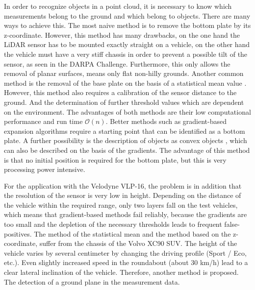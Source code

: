 \documentclass[11pt,oneside,openright]{mpreport}
\begin{document}
In order to recognize objects in a point cloud, it is necessary to know which measurements belong to the ground and which belong to objects.
There are many ways to achieve this. The most naive method is to remove the bottom plate by its z-coordinate.
However, this method has many drawbacks, on the one hand the LiDAR sensor has to be mounted exactly straight on a vehicle, 
on the other hand the vehicle must have a very stiff chassis in order to prevent a possible tilt of the sensor, as seen in the \ac{DARPA} Challenge.
Furthermore, this only allows the removal of planar surfaces, means only flat non-hilly grounds. 
Another common method is the removal of the base plate on the basis of a statistical mean value \cite{Zhang}.
However, this method also requires a calibration of the sensor distance to the ground. 
And the determination of further threshold values which are dependent on the environment.
The advantages of both methods are their low computational performance and run time $\mathcal{O}(n)$.
Better methods such as gradient-based expansion algorithms require a starting point that can be identified as a bottom plate.
A further possibility is the description of objects as convex objects \cite{5164280}, which can also be described on the basis of the gradients.
The advantage of this method is that no initial position is required for the bottom plate, but this is very processing power intensive.
% 

For the application with the Velodyne VLP-16, the problem is in addition that the resolution of the sensor is very low in height.
Depending on the distance of the vehicle within the required range, only two layers fall on the test vehicles, which means that gradient-based methods fail reliably,
because the gradients are too small and the depletion of the necessary thresholds leads to frequent false-positives. 
The method of the statistical mean and the method based on the z-coordinate, suffer from the chassis of the Volvo XC90 SUV. 
The height of the vehicle varies by several centimeter by changing the driving profile (Sport / Eco, etc.). Even slightly increased speed in the roundabout (about 30 km/h)
lead to a clear lateral inclination of the vehicle. Therefore, another method is proposed. The detection of a ground plane in the measurement data.
\end{document}
